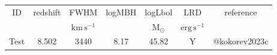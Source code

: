 \begin{table}
\begin{tabular}{ccccccc}
ID & redshift & FWHM & logMBH & logLbol & LRD & reference \\
 &  & $\mathrm{km\,s^{-1}}$ &  & $\mathrm{M_{\odot}}$ & $\mathrm{erg\,s^{-1}}$ &  \\
Test & 8.502 & 3440 & 8.17 & 45.82 & Y & @kokorev2023c \\
\end{tabular}
\end{table}
